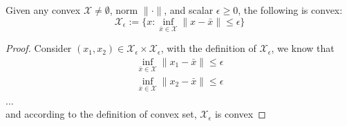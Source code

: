 \documentclass[name=FirstName\ LastName, id=studentId, course=courseId, hwname=HomeworkName]{homework}
\begin{document}
    

Given any convex $\mathcal{X} \ne \emptyset$, norm $\parallel \cdot \parallel$, and scalar $\epsilon \geq 0$, the following is convex: 
$$\mathcal{X}_{\epsilon} :=\{ x: \inf_{\bar{x} \in \mathcal{X}} \parallel x - \bar{x} \parallel \leq \epsilon \}$$
\begin{proof}
Consider $(x_{1}, x_{2}) \in \mathcal{X}_{\epsilon} \times \mathcal{X}_{\epsilon}$, with the definition of $\mathcal{X}_{\epsilon}$, we know that
\begin{align}
\inf_{\bar{x} \in \mathcal{X}}\parallel x_1 - \bar{x} \parallel \leq \epsilon \label{1}\\
\inf_{\bar{x} \in \mathcal{X}}\parallel x_2 - \bar{x} \parallel \leq \epsilon \label{2}
\end{align}
...\\
and according to the definition of convex set, $\mathcal{X}_\epsilon$ is convex



\end{proof}
\end{document}
